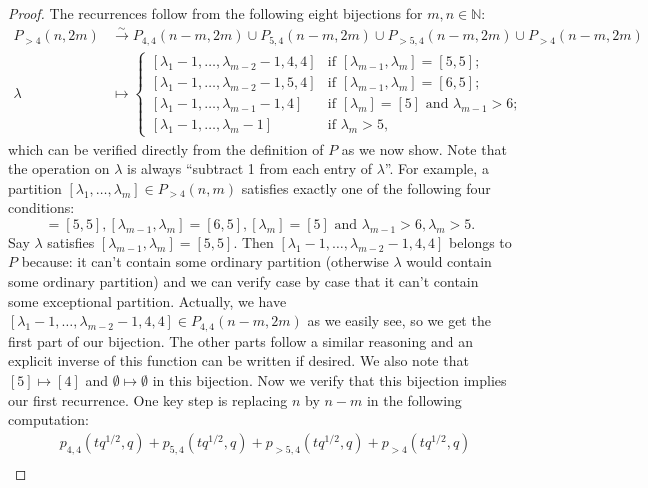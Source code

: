 \documentclass[a4paper, 12pt, reqno]{amsart}
\theoremstyle{remark}
\numberwithin{equation}{subsection}
\begin{document}
\begin{proof}
  The recurrences follow from the following eight bijections for $m, n \in \mathbb{N}$:
  \begin{align*}
    P_{>4}(n, 2m) &\xrightarrow{\sim} P_{4, 4}(n - m, 2m) \cup P_{5, 4}(n - m, 2m) \cup P_{>5, 4}(n - m, 2m) \cup P_{>4}(n - m, 2m) \\
    \lambda &\mapsto
              \begin{cases}
                [\lambda_1 - 1, \dots, \lambda_{m - 2} - 1, 4, 4] &\text{if }[\lambda_{m - 1}, \lambda_m] = [5, 5]; \\
                [\lambda_1 - 1, \dots, \lambda_{m - 2} - 1, 5, 4] &\text{if }[\lambda_{m - 1}, \lambda_m] = [6, 5]; \\
                [\lambda_1 - 1, \dots, \lambda_{m - 1} - 1, 4] &\text{if }[\lambda_m] = [5]\text{ and }\lambda_{m - 1} > 6; \\
                [\lambda_1 - 1, \dots, \lambda_m - 1] &\text{if }\lambda_m > 5,
              \end{cases}
  \end{align*}
  which can be verified directly from the definition of $P$ as we now show.
  Note that the operation on $\lambda$ is always ``subtract 1 from each entry of $\lambda$''.
  For example, a partition $[\lambda_1, \dots, \lambda_m] \in P_{>4}(n, m)$ satisfies exactly one of the following four conditions:
  \begin{equation*}
    [\lambda_{m - 1}, \lambda_m] = [5, 5], [\lambda_{m - 1}, \lambda_m] = [6, 5], [\lambda_m] = [5]\text{ and }\lambda_{m - 1} > 6, \lambda_m > 5.
  \end{equation*}
  Say $\lambda$ satisfies $[\lambda_{m - 1}, \lambda_m] = [5, 5]$.
  Then $[\lambda_1 - 1, \dots, \lambda_{m - 2} - 1, 4, 4]$ belongs to $P$ because: it can't contain some ordinary partition (otherwise $\lambda$ would contain some ordinary partition) and we can verify case by case that it can't contain some exceptional partition.
  Actually, we have $[\lambda_1 - 1, \dots, \lambda_{m - 2} - 1, 4, 4] \in P_{4, 4}(n - m, 2m)$ as we easily see, so we get the first part of our bijection.
  The other parts follow a similar reasoning and an explicit inverse of this function can be written if desired.
  We also note that $[5] \mapsto [4]$ and $\emptyset \mapsto \emptyset$ in this bijection.
  Now we verify that this bijection implies our first recurrence.
  One key step is replacing $n$ by $n - m$ in the following computation:
  \begin{align*}
    &p_{4, 4}(tq^{1/2}, q) + p_{5, 4}(tq^{1/2}, q) + p_{>5, 4}(tq^{1/2}, q) + p_{>4}(tq^{1/2}, q) \\

\end{align*}
\end{proof}
\end{document}
